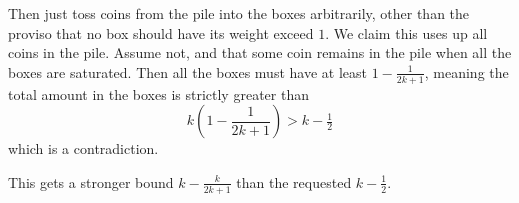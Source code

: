 Then just toss coins from the pile into the boxes arbitrarily,
other than the proviso that no box should have its weight exceed $1$.
We claim this uses up all coins in the pile.
Assume not, and that some coin remains in the pile
when all the boxes are saturated.
Then all the boxes must have at least $1 -\frac{1}{2k+1}$,
meaning the total amount in the boxes is strictly greater than
\[ k \left( 1 - \frac{1}{2k+1} \right) > k - \tfrac 12 \]
which is a contradiction.
\begin{remark*}
  This gets a stronger bound $k - \frac{k}{2k+1}$ than the requested $k-\tfrac 12$.
\end{remark*}
\pagebreak